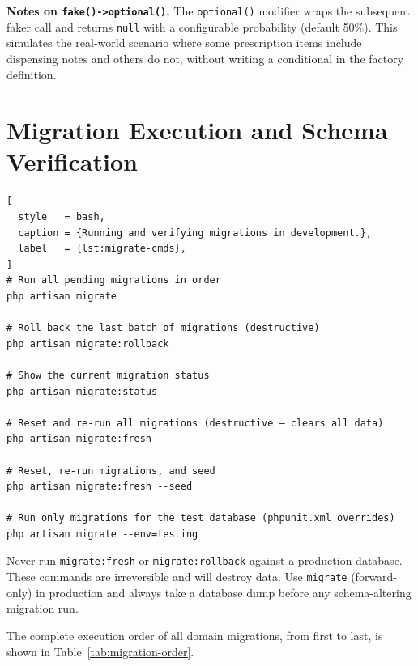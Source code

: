 \textbf{Notes on \texttt{fake()->optional()}.} The \texttt{optional()}
modifier wraps the subsequent faker call and returns \texttt{null} with
a configurable probability (default 50\%). This simulates the real-world
scenario where some prescription items include dispensing notes and
others do not, without writing a conditional in the factory definition.

\section{Migration Execution and Schema Verification}
\label{sec:migration-execution}

\begin{lstlisting}[
  style   = bash,
  caption = {Running and verifying migrations in development.},
  label   = {lst:migrate-cmds},
]
# Run all pending migrations in order
php artisan migrate

# Roll back the last batch of migrations (destructive)
php artisan migrate:rollback

# Show the current migration status
php artisan migrate:status

# Reset and re-run all migrations (destructive – clears all data)
php artisan migrate:fresh

# Reset, re-run migrations, and seed
php artisan migrate:fresh --seed

# Run only migrations for the test database (phpunit.xml overrides)
php artisan migrate --env=testing
\end{lstlisting}

\begin{warningbox}
  Never run \texttt{migrate:fresh} or \texttt{migrate:rollback} against
  a production database. These commands are irreversible and will destroy
  data. Use \texttt{migrate} (forward-only) in production and always take
  a database dump before any schema-altering migration run.
\end{warningbox}

The complete execution order of all domain migrations, from first to
last, is shown in Table~\ref{tab:migration-order}.

